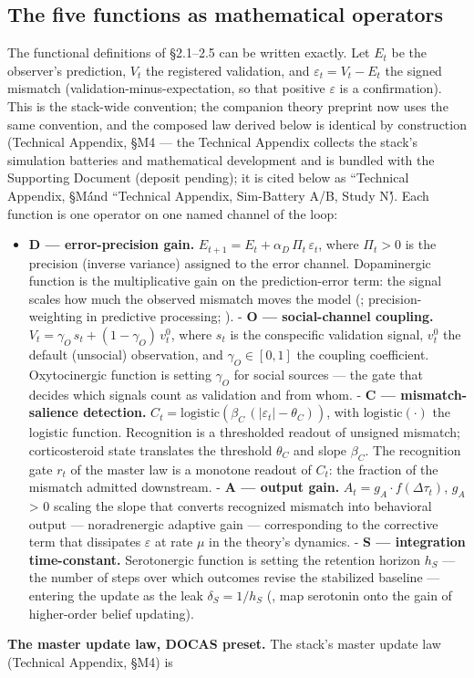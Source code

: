 \documentclass[11pt,twocolumn]{article}
\theoremstyle{plain}
\begin{document}
\subsection{The five functions as mathematical operators}

The functional definitions of \S{}2.1–2.5 can be written exactly. Let $E_{t}$ be the observer's prediction, $V_{t}$ the registered validation, and $\varepsilon_t = V_t - E_t$ the signed mismatch (validation-minus-expectation, so that positive $\varepsilon$ is a confirmation). This is the stack-wide convention; the companion theory preprint now uses the same convention, and the composed law derived below is identical by construction (Technical Appendix, \S{}M4 — the Technical Appendix collects the stack's simulation batteries and mathematical development and is bundled with the Supporting Document (deposit pending); it is cited below as ``Technical Appendix, \S{}M\'\' and ``Technical Appendix, Sim-Battery A/B, Study N\'\'). Each function is one operator on one named channel of the loop:

\begin{itemize}

\item \textbf{D — error-precision gain.} $E_{t+1} = E_t + \alpha_D\,\Pi_t\,\varepsilon_t$, where $\Pi_t > 0$ is the precision (inverse variance) assigned to the error channel. Dopaminergic function is the multiplicative gain on the prediction-error term: the signal scales how much the observed mismatch moves the model (\citealp{schultz1997}; precision-weighting in predictive processing; \citealp{rutledge2014}).
- \textbf{O — social-channel coupling.} $V_t = \gamma_O\,s_t + (1-\gamma_O)\,v_t^{0}$, where $s_{t}$ is the conspecific validation signal, $v_{t}^{{0}}$ the default (unsocial) observation, and $\gamma_O \in [0,1]$ the coupling coefficient. Oxytocinergic function is setting $\gamma_O$ for social sources — the gate that decides which signals count as validation and from whom.
- \textbf{C — mismatch-salience detection.} $C_t = \mathrm{logistic}\!\left(\beta_C\,\left(|\varepsilon_t| - \theta_C\right)\right)$, with $\mathrm{logistic}(\cdot)$ the logistic function. Recognition is a thresholded readout of unsigned mismatch; corticosteroid state translates the threshold $\theta_C$ and slope $\beta_C$. The recognition gate $r_t$ of the master law is a monotone readout of $C_{t}$: the fraction of the mismatch admitted downstream.
- \textbf{A — output gain.} $A_t = g_A \cdot f(\Delta\tau_t)$, $g_{A}$ > 0 scaling the slope that converts recognized mismatch into behavioral output — noradrenergic adaptive gain \citep{astonjones2005} — corresponding to the corrective term that dissipates $\varepsilon$ at rate $\mu$ in the theory's dynamics.
- \textbf{S — integration time-constant.} Serotonergic function is setting the retention horizon $h_{S}$ — the number of steps over which outcomes revise the stabilized baseline — entering the update as the leak $\delta_S = 1/h_S$ (\citealp{shine2021}, map serotonin onto the gain of higher-order belief updating).

\end{itemize}
\textbf{The master update law, DOCAS preset.} The stack's master update law (Technical Appendix, \S{}M4) is
\end{document}
